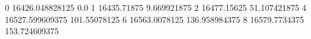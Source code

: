 0 16426.048828125 0.0
1 16435.71875 9.669921875
2 16477.15625 51.107421875
4 16527.599609375 101.55078125
6 16563.0078125 136.958984375
8 16579.7734375 153.724609375
